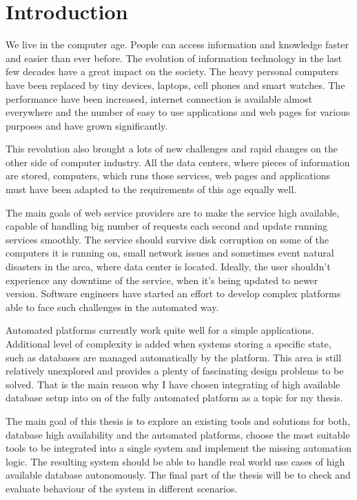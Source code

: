 \documentclass[
  digital, %
  twoside, %
  table,   %
  lof,     %
  lot,     %
]{fithesis3}
\begin{document}
\chapter{Introduction}

We live in the computer age. People can access information and knowledge faster and easier than ever before. The evolution of information technology in the last few decades have a great impact on the society. The heavy personal computers have been replaced by tiny devices, laptops, cell phones and smart watches. The performance have been increased, internet connection is available almost everywhere and the number of easy to use applications and web pages for various purposes and have grown significantly.

This revolution also brought a lots of new challenges and rapid changes on the other side of computer industry. All the data centers, where pieces of information are stored, computers, which runs those services, web pages and applications must have been adapted to the requirements of this age equally well.

The main goals of web service providers are to make the service high available, capable of handling big number of requests each second and update running services smoothly. The service should survive disk corruption on some of the computers it is running on, small network issues and sometimes event natural disasters in the area, where data center is located. Ideally, the user shouldn't experience any downtime of the service, when it's being updated to newer version. Software engineers have started an effort to develop complex platforms able to face such challenges in the automated way.

Automated platforms currently work quite well for a simple applications. Additional level of complexity is added when  systems storing a specific state, such as databases are managed automatically by the platform. This area is still relatively unexplored and provides a plenty of fascinating design problems to be solved. That is the main reason why I have chosen integrating of high available database setup into on of the fully automated platform as a topic for my thesis.

The main goal of this thesis is to explore an existing tools and solutions for both, database high availability and the automated platforms, choose the most suitable tools to be integrated into a single system and implement the missing automation logic. The resulting system should be able to handle real world use cases of high available database autonomously. The final part of the thesis will be to check and evaluate behaviour of the system in different scenarios.
\end{document}
